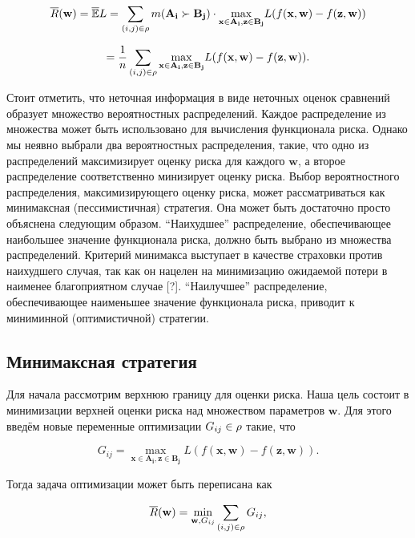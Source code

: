 \documentclass[12pt,a4paper,oneside]{article}
\begin{document}
\[
\overline{R}(\mathbf{w}) = \mathbb{\overline{E}} L = \sum \limits_{(i,j) \in \Rho} m(\mathbf{A_i} \succ \mathbf{B_j}) \cdot \underset{%
	\mathbf{x} \in \mathbf{A_i}, \mathbf{z} \in \mathbf{B_j}%
}{\operatorname{max}}
L (f (\mathbf{x}, \mathbf{w}) - f(\mathbf{z}, \mathbf{w}))
\]

\[
= \frac{1}{n} \sum \limits_{(i,j) \in \Rho} \underset{%
	\mathbf{x} \in \mathbf{A_i}, \mathbf{z} \in \mathbf{B_j}%
}{\operatorname{max}}%
L (f(\mathbf{x}, \mathbf{w}) - f(\mathbf{z}, \mathbf{w})).
\]

\par
Стоит отметить, что неточная информация в виде неточных оценок сравнений образует множество вероятностных распределений. 
Каждое распределение из множества может быть использовано для вычисления функционала риска.
Однако мы неявно выбрали два вероятностных распределения, такие, что одно из распределений максимизирует оценку риска для каждого \(\mathbf{w}\), а второе распределение соответственно минизирует оценку риска. 
Выбор вероятностного распределения, максимизирующего оценку риска, может рассматриваться как минимаксная (пессимистичная) стратегия. 
Она может быть достаточно просто объяснена следующим образом. 
``Наихудшее'' распределение, обеспечивающее наибольшее значение функционала риска, должно быть выбрано из множества распределений. 
Критерий минимакса выступает в качестве страховки против наихудшего случая, так как он нацелен на минимизацию ожидаемой потери в наименее благоприятном случае [?]. 
``Наилучшее'' распределение, обеспечивающее наименьшее значение функционала риска, приводит к миниминной (оптимистичной) стратегии.

\subsection{Минимаксная стратегия}

\par
Для начала рассмотрим верхнюю границу для оценки риска. 
Наша цель состоит в минимизации верхней оценки риска над множеством параметров \(\mathbf{w}\). 
Для этого введём новые переменные оптимизации \(G_{ij} \in \mathrm{\rho}\) такие, что

\[
G_{ij} = \underset{\mathbf{x} \in \mathbf{A_i}, \mathbf{z} \in \mathbf{B_j}}{\operatorname{max}} L (f (\mathbf{x}, \mathbf{w}) - f(\mathbf{z}, \mathbf{w})). 
\]

\par
Тогда задача оптимизации может быть переписана как

\[
\overline{R}(\mathbf{w}) = \underset{\mathbf{w}, G_{ij}}{\operatorname{min}} \sum \limits_{(i, j) \in \mathrm{\rho}} G_{ij},
\]
\end{document}
